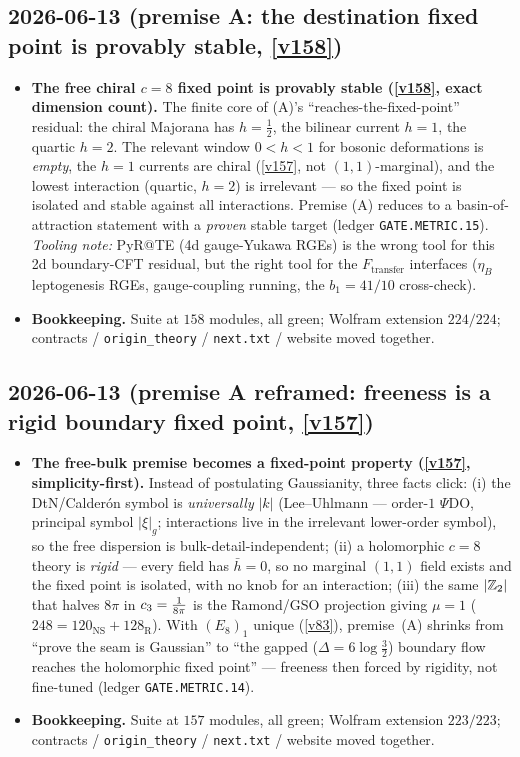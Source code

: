 \subsection*{2026-06-13 (premise A: the destination fixed point is provably stable, \vref{v158})}
\begin{itemize}
\item \textbf{The free chiral $c{=}8$ fixed point is provably stable (\vref{v158}, exact dimension count).}
  The finite core of (A)'s ``reaches-the-fixed-point'' residual: the chiral Majorana has $h{=}\tfrac12$,
  the bilinear current $h{=}1$, the quartic $h{=}2$. The relevant window $0<h<1$ for bosonic deformations
  is \emph{empty}, the $h{=}1$ currents are chiral (\vref{v157}, not $(1,1)$-marginal), and the lowest
  interaction (quartic, $h{=}2$) is irrelevant --- so the fixed point is isolated and stable against all
  interactions. Premise (A) reduces to a basin-of-attraction statement with a \emph{proven} stable target
  (ledger \texttt{GATE.METRIC.15}). \emph{Tooling note:} PyR@TE (4d gauge-Yukawa RGEs) is the wrong tool
  for this 2d boundary-CFT residual, but the right tool for the $F_{\mathrm{transfer}}$ interfaces
  ($\eta_B$ leptogenesis RGEs, gauge-coupling running, the $b_1{=}41/10$ cross-check).
\item \textbf{Bookkeeping.} Suite at $158$ modules, all green; Wolfram extension $224/224$;
  contracts / \texttt{origin\_theory} / \texttt{next.txt} / website moved together.
\end{itemize}

\subsection*{2026-06-13 (premise A reframed: freeness is a rigid boundary fixed point, \vref{v157})}
\begin{itemize}
\item \textbf{The free-bulk premise becomes a fixed-point property (\vref{v157}, simplicity-first).}
  Instead of postulating Gaussianity, three facts click: (i) the DtN/Calder\'on symbol is
  \emph{universally} $|k|$ (Lee--Uhlmann --- order-$1$ $\Psi$DO, principal symbol $|\xi|_g$;
  interactions live in the irrelevant lower-order symbol), so the free dispersion is
  bulk-detail-independent; (ii) a holomorphic $c{=}8$ theory is \emph{rigid} --- every field has
  $\bar h{=}0$, so no marginal $(1,1)$ field exists and the fixed point is isolated, with no knob for an
  interaction; (iii) the same $|\mathbb{Z}_2|$ that halves $8\pi$ in $c_3=\tfrac1{8\pi}$ is the Ramond/GSO
  projection giving $\mu{=}1$ ($248{=}120_{\mathrm{NS}}{+}128_{\mathrm R}$). With $(E_8)_1$ unique
  (\vref{v83}), premise~(A) shrinks from ``prove the seam is Gaussian'' to ``the gapped
  ($\Delta{=}6\log\tfrac32$) boundary flow reaches the holomorphic fixed point'' --- freeness then forced
  by rigidity, not fine-tuned (ledger \texttt{GATE.METRIC.14}).
\item \textbf{Bookkeeping.} Suite at $157$ modules, all green; Wolfram extension $223/223$;
  contracts / \texttt{origin\_theory} / \texttt{next.txt} / website moved together.
\end{itemize}

